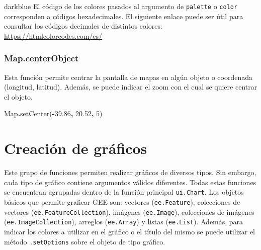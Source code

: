 \documentclass[
  12pt,
  letterpaper,
  twoside]{book}
\newenvironment{Shaded}{\begin{snugshade}}{\end{snugshade}}
\newcommand{\BuiltInTok}[1]{#1}
\newcommand{\DecValTok}[1]{\textcolor[rgb]{0.00,0.00,0.81}{#1}}
\newcommand{\FloatTok}[1]{\textcolor[rgb]{0.00,0.00,0.81}{#1}}
\newcommand{\FunctionTok}[1]{\textcolor[rgb]{0.00,0.00,0.00}{#1}}
\newcommand{\NormalTok}[1]{#1}
\newcommand{\OperatorTok}[1]{\textcolor[rgb]{0.81,0.36,0.00}{\textbf{#1}}}
\begin{document}
\begin{bluebox2}

\begin{awesomeblock}{5pt}{\faLightbulb}{darkblue}
El código de los colores pasados al argumento de \texttt{palette} o \texttt{color} corresponden a códigos hexadecimales. El siguiente enlace puede ser útil para consultar los códigos decimales de distintos colores: \url{https://htmlcolorcodes.com/es/}

\end{awesomeblock}

\end{bluebox2}

\hypertarget{map.centerobject}{%
\subsubsection*{Map.centerObject}\label{map.centerobject}}

Esta función permite centrar la pantalla de mapas en algún objeto o coordenada (longitud, latitud). Además, se puede indicar el zoom con el cual se quiere centrar el objeto.

\begin{Shaded}
\begin{Highlighting}[]
\BuiltInTok{Map}\OperatorTok{.}\FunctionTok{setCenter}\NormalTok{(}\OperatorTok{{-}}\FloatTok{39.86}\OperatorTok{,} \FloatTok{20.52}\OperatorTok{,} \DecValTok{5}\NormalTok{)}
\end{Highlighting}
\end{Shaded}

\hypertarget{creaciuxf3n-de-gruxe1ficos}{%
\section{Creación de gráficos}\label{creaciuxf3n-de-gruxe1ficos}}

Este grupo de funciones permiten realizar gráficos de diversos tipos. Sin embargo, cada tipo de gráfico contiene argumentos válidos diferentes. Todas estas funciones se encuentran agrupadas dentro de la función principal \texttt{ui.Chart}. Los objetos básicos que permite graficar GEE son: vectores (\texttt{ee.Feature}), colecciones de vectores (\texttt{ee.FeatureCollection}), imágenes (\texttt{ee.Image}), colecciones de imágenes (\texttt{ee.ImageCollection}), arreglos (\texttt{ee.Array}) y listas (\texttt{ee.List}). Además, para indicar los colores a utilizar en el gráfico o el título del mismo se puede utilizar el método \texttt{.setOptions} sobre el objeto de tipo gráfico.
\end{document}
